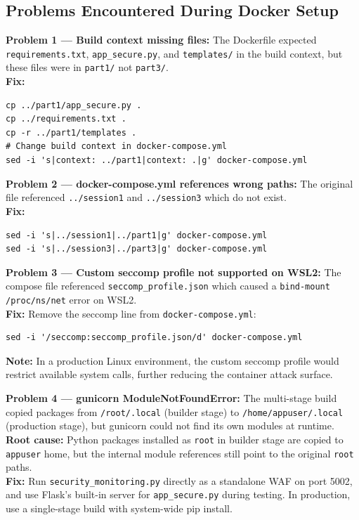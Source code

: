 \documentclass[12pt,a4paper]{report}
\begin{document}
\subsection{Problems Encountered During Docker Setup}

\begin{warningbox}
\textbf{Problem 1 — Build context missing files:}
The Dockerfile expected \texttt{requirements.txt}, \texttt{app\_secure.py}, and \texttt{templates/} in the build context, but these files were in \texttt{part1/} not \texttt{part3/}.\\[4pt]
\textbf{Fix:}
\begin{lstlisting}[style=bashstyle]
cp ../part1/app_secure.py .
cp ../requirements.txt .
cp -r ../part1/templates .
# Change build context in docker-compose.yml
sed -i 's|context: ../part1|context: .|g' docker-compose.yml
\end{lstlisting}
\end{warningbox}

\begin{warningbox}
\textbf{Problem 2 — docker-compose.yml references wrong paths:}
The original file referenced \texttt{../session1} and \texttt{../session3} which do not exist.\\[4pt]
\textbf{Fix:}
\begin{lstlisting}[style=bashstyle]
sed -i 's|../session1|../part1|g' docker-compose.yml
sed -i 's|../session3|../part3|g' docker-compose.yml
\end{lstlisting}
\end{warningbox}

\begin{warningbox}
\textbf{Problem 3 — Custom seccomp profile not supported on WSL2:}
The compose file referenced \texttt{seccomp\_profile.json} which caused a \texttt{bind-mount /proc/ns/net} error on WSL2.\\[4pt]
\textbf{Fix:} Remove the seccomp line from \texttt{docker-compose.yml}:
\begin{lstlisting}[style=bashstyle]
sed -i '/seccomp:seccomp_profile.json/d' docker-compose.yml
\end{lstlisting}
\textbf{Note:} In a production Linux environment, the custom seccomp profile would restrict available system calls, further reducing the container attack surface.
\end{warningbox}

\begin{warningbox}
\textbf{Problem 4 — gunicorn ModuleNotFoundError:}
The multi-stage build copied packages from \texttt{/root/.local} (builder stage) to \texttt{/home/appuser/.local} (production stage), but gunicorn could not find its own modules at runtime.\\[4pt]
\textbf{Root cause:} Python packages installed as \texttt{root} in builder stage are copied to \texttt{appuser} home, but the internal module references still point to the original \texttt{root} paths.\\[4pt]
\textbf{Fix:} Run \texttt{security\_monitoring.py} directly as a standalone WAF on port 5002, and use Flask's built-in server for \texttt{app\_secure.py} during testing. In production, use a single-stage build with system-wide pip install.
\end{warningbox}
\end{document}
